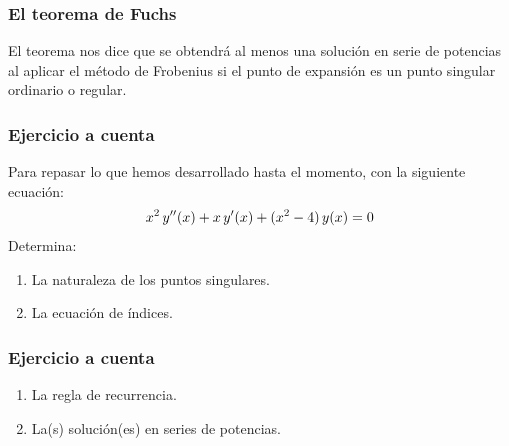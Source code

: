 \documentclass[12pt]{beamer}
\begin{document}
\begin{frame}
\frametitle{El teorema de Fuchs}
El teorema nos dice que se obtendrá al menos una solución en serie de potencias al aplicar el método de Frobenius si el punto de expansión es un punto singular ordinario o regular.
\end{frame}
\begin{frame}
\frametitle{Ejercicio a cuenta}
Para repasar lo que hemos desarrollado hasta el momento, con la siguiente ecuación:
\pause
\begin{align*}
x^{2} \, {y}^{\prime \prime} (x) + x \, {y}^{\prime} (x) + (x^{2} - 4) \, y (x) = 0
\end{align*}
Determina:
\begin{enumerate}
\item La naturaleza de los puntos singulares.
\item La ecuación de índices.
\seti
\end{enumerate}
\end{frame}
\begin{frame}
\frametitle{Ejercicio a cuenta}
\begin{enumerate}
\conti
\item La regla de recurrencia.
\item La(s) solución(es) en series de potencias.
\end{enumerate}
\end{frame}
\end{document}
